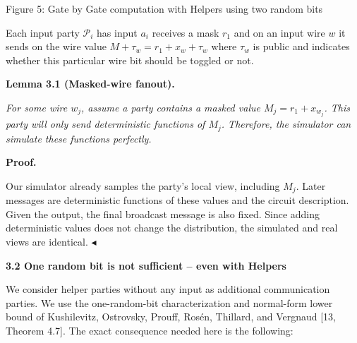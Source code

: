 


Figure 5: Gate by Gate computation with Helpers using two random bits



Each input party $\mathcal{P}_{i}$ has input $a_{i}$ receives a mask $r_{1}$ and on an input wire $w$ it sends on the wire value $M+\tau_{w}=r_{1}+x_{w}+\tau_{w}$
where $\tau_{w}$ is public and indicates whether this particular wire bit should be toggled or not.\par





\par\medskip\noindent\textbf{
\textbf{Lemma 3.1}\textbf{ }(Masked-wire fanout)\textbf{.}
}\par



\emph{For some wire $w_{j}$, assume a party contains a masked value
$M_{j}=r_{1}+x_{w_{j}}$.
This party will only send deterministic functions of $M_{j}$. Therefore, the simulator can simulate these functions perfectly.}\par






\par\medskip\noindent\textbf{Proof.}\par




Our simulator already samples the party’s local view, including
$M_{j}$. Later messages are deterministic functions of these values
and the circuit description. Given the output, the final broadcast message is also fixed.
Since adding deterministic values does not change the distribution, the
simulated and real views are identical.
$\blacktriangleleft$\par






\par\medskip\noindent\textbf{
3.2 One random bit is not sufficient – even with Helpers}\par




We consider helper parties without any input as additional communication parties. We use the one-random-bit characterization and normal-form lower bound of Kushilevitz, Ostrovsky, Prouff, Rosén, Thillard, and Vergnaud [13, Theorem 4.7]. The exact consequence needed here is the following:\par



